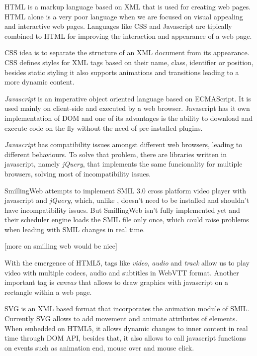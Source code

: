   \ac{HTML} is a markup language based on \ac{XML} that is used for creating web pages. \ac{HTML} alone is a very poor language when we are focused on visual appealing and interactive web pages. Languages like \ac{CSS} and Javascript are tipically combined to \ac{HTML} for improving the interaction and appearance of a web page. 

  \ac{CSS} idea is to separate the structure of an \ac{XML} document from its appearance. \ac{CSS} defines styles for \ac{XML} tags based on their name, class, identifier or position, besides static styling it also supports animations and transitions leading to a more dynamic content.

  \textit{Javascript} is an imperative object oriented language based on ECMAScript. It is used mainly on client-side and executed by a web browser. Javascript has it own implementation of \ac{DOM} and one of its advantages is the ability to download and execute code on the fly without the need of pre-installed plugins.

  \textit{Javascript} has compatibility issues amongst different web browsers, leading to different behaviours. To solve that problem, there are libraries written in javascript, namely \textit{jQuery}, that implements the same funcionality for multiple browsers, solving most of incompatibility issues.

  SmillingWeb \cite{smillingweb} attempts to implement \ac{SMIL} 3.0 cross platform video player with javascript and \textit{jQuery}, which, unlike \cite{ambulant}, doesn't need to be installed and shouldn't have incompatibility issues. But SmillingWeb isn't fully implemented yet and their scheduler engine loads the \ac{SMIL} file only once, which could raise problems when leading with \ac{SMIL} changes in real time.  

{\color{red} [more on smilling web would be nice]}

  With the emergence of \ac{HTML}5, tags like \textit{video}, \textit{audio} and \textit{track} allow us to play video with multiple codecs, audio and subtitles in \ac{WebVTT} format. Another important tag is \textit{canvas} that allows to draw graphics with javascript on a rectangle within a web page.

  \ac{SVG} is an \ac{XML} based format that incorporates the animation module of \ac{SMIL}. Currently \ac{SVG} allows to add movement and animate attributes of elements. When embedded on \ac{HTML}5, it allows dynamic changes to inner content in real time through \ac{DOM} \ac{API}, besides that, it also allows to call javascript functions on events such as animation end, mouse over and mouse click.

